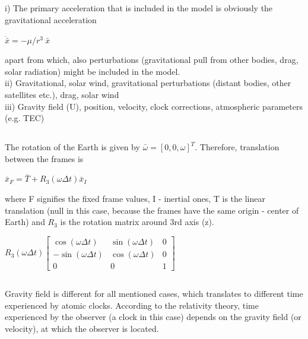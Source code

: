 \subsection{}
i) The primary acceleration that is included in the model is obviously the gravitational acceleration
\begin{center}
	$\ddot{\bar{x}} = -\mu/r^3\:\bar{x}$
\end{center}
apart from which, also perturbations (gravitational pull from other bodies, drag, solar radiation) might be included in the model.\\
ii) Gravitational, solar wind, gravitational perturbations (distant bodies, other satellites etc.), drag, solar wind\\
iii) Gravity field (U), position, velocity, clock corrections, atmospheric parameters (e.g. TEC)\\

\subsection{}
The rotation of the Earth is given by $\bar{\omega} = [0,0,\omega]^T$. Therefore, translation between the frames is
\begin{center}
	$\bar{x}_F = \bar{T}+R_3(\omega \Delta t)\bar{x}_I$
\end{center}
where F signifies the fixed frame values, I - inertial ones, T is the linear translation (null in this case, because the frames have the same origin - center of Earth) and $R_3$ is the rotation matrix around 3rd axis (z).
\begin{center}
	$R_3(\omega \Delta t)
	    \begin{bmatrix}
	    
	        \cos (\omega \Delta t) & \sin (\omega \Delta t) & 0\\[6pt]
	        
	        - \sin (\omega \Delta t) & \cos (\omega \Delta t) & 0\\[6pt]
	        
	        0 & 0 & 1
	        
	        
	    
	    \end{bmatrix}$
\end{center}

\subsection{}

\indent Gravity field is different for all mentioned cases, which translates to different time experienced by atomic clocks. According to the relativity theory, time experienced by the observer (a clock in this case) depends on the gravity field (or velocity), at which the observer is located.












